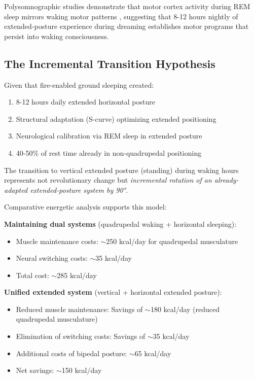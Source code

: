 \documentclass[12pt,a4paper]{article}
\begin{document}
Polysomnographic studies demonstrate that motor cortex activity during REM sleep mirrors waking motor patterns \citep{hobson2009rem}, suggesting that 8-12 hours nightly of extended-posture experience during dreaming establishes motor programs that persist into waking consciousness.

\subsection{The Incremental Transition Hypothesis}

Given that fire-enabled ground sleeping created:
\begin{enumerate}
\item 8-12 hours daily extended horizontal posture
\item Structural adaptation (S-curve) optimizing extended positioning
\item Neurological calibration via REM sleep in extended posture
\item 40-50\% of rest time already in non-quadrupedal positioning
\end{enumerate}

The transition to vertical extended posture (standing) during waking hours represents not revolutionary change but \textit{incremental rotation of an already-adapted extended-posture system by 90°}.

Comparative energetic analysis supports this model:

\textbf{Maintaining dual systems} (quadrupedal waking + horizontal sleeping):
\begin{itemize}
\item Muscle maintenance costs: $\sim$250 kcal/day for quadrupedal musculature
\item Neural switching costs: $\sim$35 kcal/day
\item Total cost: $\sim$285 kcal/day
\end{itemize}

\textbf{Unified extended system} (vertical + horizontal extended posture):
\begin{itemize}
\item Reduced muscle maintenance: Savings of $\sim$180 kcal/day (reduced quadrupedal musculature)
\item Elimination of switching costs: Savings of $\sim$35 kcal/day
\item Additional costs of bipedal posture: $\sim$65 kcal/day
\item Net savings: $\sim$150 kcal/day
\end{itemize}
\end{document}

